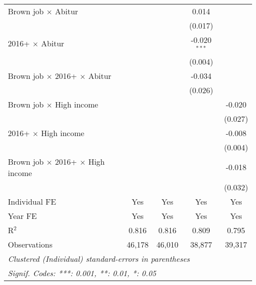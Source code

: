 \begin{table}[htbp]
\begin{tabular}{lcccc}
      Brown job $\times$ Abitur                       &                &              & 0.014          &   \\   
                                                      &                &              & (0.017)        &   \\   
      2016+ $\times$ Abitur                           &                &              & -0.020$^{***}$ &   \\   
                                                      &                &              & (0.004)        &   \\   
      Brown job $\times$ 2016+ $\times$ Abitur        &                &              & -0.034         &   \\   
                                                      &                &              & (0.026)        &   \\   
      Brown job $\times$ High income                  &                &              &                & -0.020\\   
                                                      &                &              &                & (0.027)\\   
      2016+ $\times$ High income                      &                &              &                & -0.008\\   
                                                      &                &              &                & (0.004)\\   
      Brown job $\times$ 2016+ $\times$ High income   &                &              &                & -0.018\\   
                                                      &                &              &                & (0.032)\\   
      Individual FE                                   & Yes            & Yes          & Yes            & Yes\\  
      Year FE                                         & Yes            & Yes          & Yes            & Yes\\  
      R$^2$                                           & 0.816          & 0.816        & 0.809          & 0.795\\  
      Observations                                    & 46,178         & 46,010       & 38,877         & 39,317\\  
      \midrule \midrule
      \multicolumn{5}{l}{\emph{Clustered (Individual) standard-errors in parentheses}}\\
      \multicolumn{5}{l}{\emph{Signif. Codes: ***: 0.001, **: 0.01, *: 0.05}}\\
   \end{tabular}
\end{table}



